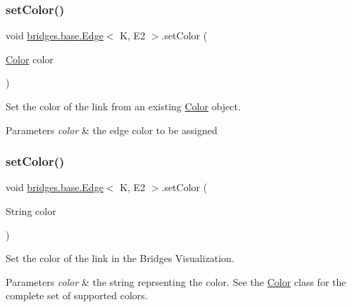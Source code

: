 \subsubsection{\texorpdfstring{set\+Color()}{setColor()}\hspace{0.1cm}{\footnotesize\ttfamily [1/3]}}
{\footnotesize\ttfamily void \hyperlink{classbridges_1_1base_1_1_edge}{bridges.\+base.\+Edge}$<$ K, E2 $>$.set\+Color (\begin{DoxyParamCaption}\item[{\hyperlink{classbridges_1_1base_1_1_color}{Color}}]{color }\end{DoxyParamCaption})}



Set the color of the link from an existing \hyperlink{classbridges_1_1base_1_1_color}{Color} object. 


\begin{DoxyParams}{Parameters}
{\em color} & the edge color to be assigned \\
\hline
\end{DoxyParams}
\mbox{\label{classbridges_1_1base_1_1_edge_adc2dbd9f8d74f8749ba64515ca052909}} 
\subsubsection{\texorpdfstring{set\+Color()}{setColor()}\hspace{0.1cm}{\footnotesize\ttfamily [2/3]}}
{\footnotesize\ttfamily void \hyperlink{classbridges_1_1base_1_1_edge}{bridges.\+base.\+Edge}$<$ K, E2 $>$.set\+Color (\begin{DoxyParamCaption}\item[{String}]{color }\end{DoxyParamCaption})}



Set the color of the link in the Bridges Visualization. 


\begin{DoxyParams}{Parameters}
{\em color} & the string reprsenting the color. See the \hyperlink{classbridges_1_1base_1_1_color}{Color} class for the complete set of supported colors. \\
\hline
\end{DoxyParams}
\mbox{\label{classbridges_1_1base_1_1_edge_a4ecf6bdaf140202b41c8a929fbdcdc0c}} 
